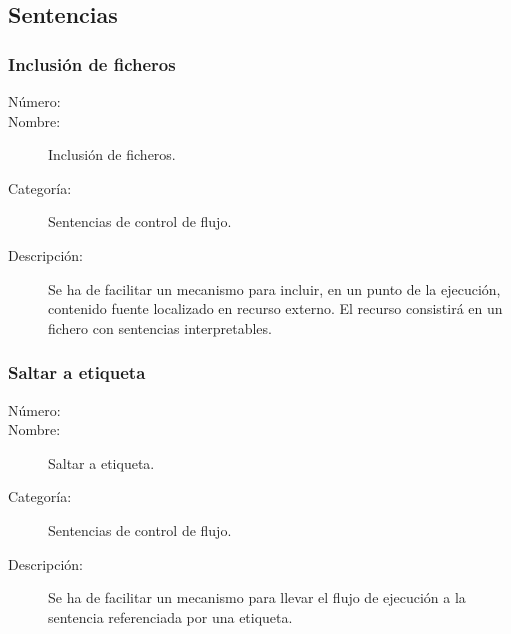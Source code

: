 \subsection{Sentencias}
\subsubsection{Inclusión de ficheros}
\begin{framed}
	\begin{description}
		\item [Número:] \cn
		\item [Nombre:] Inclusión de ficheros.
		\item [Categoría:] Sentencias de control de flujo.
		\item [Descripción:] Se ha de facilitar un mecanismo para incluir, en un punto de la ejecución, contenido fuente localizado en recurso
		externo. El recurso consistirá en un fichero con sentencias interpretables.
	\end {description}
\end{framed}

\subsubsection{Saltar a etiqueta}
\begin{framed}
	\begin{description}
		\item [Número:] \cn
		\item [Nombre:] Saltar a etiqueta.
		\item [Categoría:] Sentencias de control de flujo.
		\item [Descripción:] Se ha de facilitar un mecanismo para llevar el flujo de ejecución a la sentencia  
		referenciada por una etiqueta.
	\end {description}
\end{framed}

